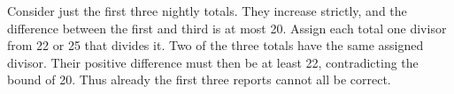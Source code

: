 Consider just the first three nightly totals. They increase strictly, and the difference between the first and third is at most 20. Assign each total one divisor from 22 or 25 that divides it. Two of the three totals have the same assigned divisor. Their positive difference must then be at least 22, contradicting the bound of 20. Thus already the first three reports cannot all be correct.
